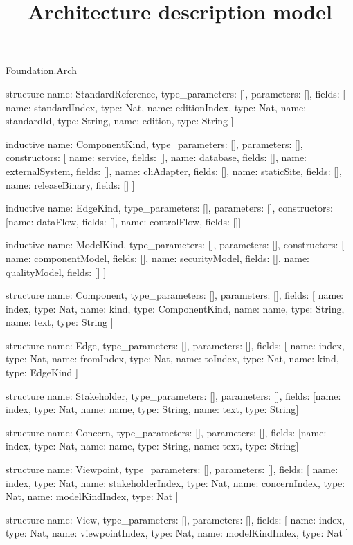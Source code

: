 \begin{lexlean}{Foundation.Arch}
\title{Architecture description model}
\begin{semanticmodule}
structure{
  name: StandardReference,
  type_parameters: [],
  parameters: [],
  fields: [
    {name: standardIndex, type: Nat},
    {name: editionIndex, type: Nat},
    {name: standardId, type: String},
    {name: edition, type: String}
  ]
}

inductive{
  name: ComponentKind,
  type_parameters: [],
  parameters: [],
  constructors: [
    {name: service, fields: []},
    {name: database, fields: []},
    {name: externalSystem, fields: []},
    {name: cliAdapter, fields: []},
    {name: staticSite, fields: []},
    {name: releaseBinary, fields: []}
  ]
}

inductive{
  name: EdgeKind,
  type_parameters: [],
  parameters: [],
  constructors: [{name: dataFlow, fields: []}, {name: controlFlow, fields: []}]
}

inductive{
  name: ModelKind,
  type_parameters: [],
  parameters: [],
  constructors: [
    {name: componentModel, fields: []},
    {name: securityModel, fields: []},
    {name: qualityModel, fields: []}
  ]
}

structure{
  name: Component,
  type_parameters: [],
  parameters: [],
  fields: [
    {name: index, type: Nat},
    {name: kind, type: ComponentKind},
    {name: name, type: String},
    {name: text, type: String}
  ]
}

structure{
  name: Edge,
  type_parameters: [],
  parameters: [],
  fields: [
    {name: index, type: Nat},
    {name: fromIndex, type: Nat},
    {name: toIndex, type: Nat},
    {name: kind, type: EdgeKind}
  ]
}

structure{
  name: Stakeholder,
  type_parameters: [],
  parameters: [],
  fields: [{name: index, type: Nat}, {name: name, type: String}, {name: text, type: String}]
}

structure{
  name: Concern,
  type_parameters: [],
  parameters: [],
  fields: [{name: index, type: Nat}, {name: name, type: String}, {name: text, type: String}]
}

structure{
  name: Viewpoint,
  type_parameters: [],
  parameters: [],
  fields: [
    {name: index, type: Nat},
    {name: stakeholderIndex, type: Nat},
    {name: concernIndex, type: Nat},
    {name: modelKindIndex, type: Nat}
  ]
}

structure{
  name: View,
  type_parameters: [],
  parameters: [],
  fields: [
    {name: index, type: Nat},
    {name: viewpointIndex, type: Nat},
    {name: modelKindIndex, type: Nat}
  ]
}


\end{semanticmodule}
\end{lexlean}
